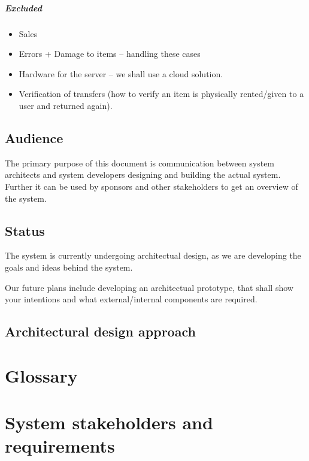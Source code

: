 \documentclass[a4paper,11pt]{report}
\begin{document}
\paragraph{Excluded}
\begin{itemize}
\item Sales
\item Errors + Damage to items -- handling these cases
\item Hardware for the server -- we shall use a cloud solution.
\item Verification of transfers (how to verify an item is physically rented/given to a user and returned again).
\end{itemize}

\section{Audience}
\label{sec:audience}
The primary purpose of this document is communication between system architects
and system developers designing and building the actual system.
Further it can be used by sponsors and other stakeholders to get an overview of
the system.

\section{Status}
\label{sec:status}
The system is currently undergoing architectual design, as we are developing
the goals and ideas behind the system.

Our future plans include developing an architectual prototype, that shall show
your intentions and what external/internal components are required.

\section{Architectural design approach}
\label{sec:arch-design-appr}


\chapter{Glossary}
\label{cha:glossary}
\thispagestyle{fancy}

\chapter{System stakeholders and requirements}
\label{cha:syst-stak-requ}
\thispagestyle{fancy}
\end{document}
